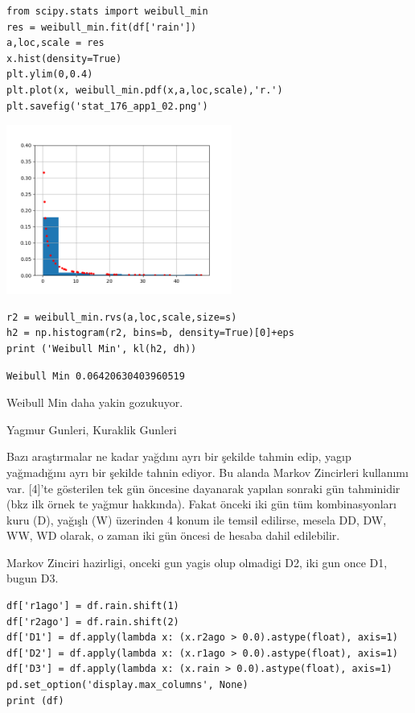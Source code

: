 \documentclass[12pt,fleqn]{article}\usepackage{../../common}
\begin{document}
\begin{verbatim}
from scipy.stats import weibull_min
res = weibull_min.fit(df['rain'])
a,loc,scale = res  
x.hist(density=True)
plt.ylim(0,0.4)
plt.plot(x, weibull_min.pdf(x,a,loc,scale),'r.')
plt.savefig('stat_176_app1_02.png')
\end{verbatim}

\includegraphics[width=20em]{stat_176_app1_02.png}

\begin{verbatim}
r2 = weibull_min.rvs(a,loc,scale,size=s)
h2 = np.histogram(r2, bins=b, density=True)[0]+eps
print ('Weibull Min', kl(h2, dh))
\end{verbatim}

\begin{verbatim}
Weibull Min 0.06420630403960519
\end{verbatim}

Weibull Min daha yakin gozukuyor.

Yagmur Gunleri, Kuraklik Gunleri

Bazı araştırmalar ne kadar yağdını ayrı bir şekilde tahmin edip, yagıp
yağmadığını ayrı bir şekilde tahnin ediyor. Bu alanda Markov Zincirleri
kullanımı var. [4]'te gösterilen tek gün öncesine dayanarak yapılan
sonraki gün tahminidir (bkz ilk örnek te yağmur hakkında). Fakat önceki
iki gün tüm kombinasyonları kuru (D), yağışlı (W) üzerinden 4 konum ile
temsil edilirse, mesela DD, DW, WW, WD olarak, o zaman iki gün öncesi de
hesaba dahil edilebilir.

Markov Zinciri hazirligi, onceki gun yagis olup olmadigi D2, iki gun once D1,
bugun D3.

\begin{verbatim}
df['r1ago'] = df.rain.shift(1)
df['r2ago'] = df.rain.shift(2)
df['D1'] = df.apply(lambda x: (x.r2ago > 0.0).astype(float), axis=1)
df['D2'] = df.apply(lambda x: (x.r1ago > 0.0).astype(float), axis=1)
df['D3'] = df.apply(lambda x: (x.rain > 0.0).astype(float), axis=1)
pd.set_option('display.max_columns', None)
print (df)
\end{verbatim}
\end{document}
